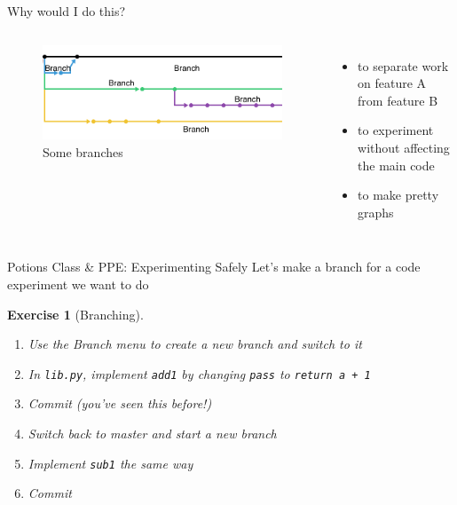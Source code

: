 \documentclass{beamer}
\theoremstyle{example}
\newtheorem{exercise}{Exercise}
\begin{document}
\begin{frame}{Why would I do this?}
    \begin{columns}
        \begin{figure}
            \includegraphics[scale=0.4]{img/branches}
            \caption{Some branches}
        \end{figure}

        \begin{itemize}
            \item to separate work on feature A from feature B
            \item to experiment without affecting the main code
            \item to make pretty graphs
        \end{itemize}
    \end{columns}
\end{frame}

\begin{frame}{Potions Class \& PPE\@: Experimenting Safely}
    Let's make a branch for a code experiment we want to do
    \begin{exercise}[Branching]
        \begin{enumerate}
            \item Use the Branch menu to create a new branch and switch to it
            \item In \texttt{lib.py}, implement \texttt{add1} by changing
                \texttt{pass} to \texttt{return a + 1}
            \item Commit (you've seen this before!)
            \item Switch back to master and start a new branch
            \item Implement \texttt{sub1} the same way
            \item Commit
        \end{enumerate}
    \end{exercise}
\end{frame}
\end{document}
